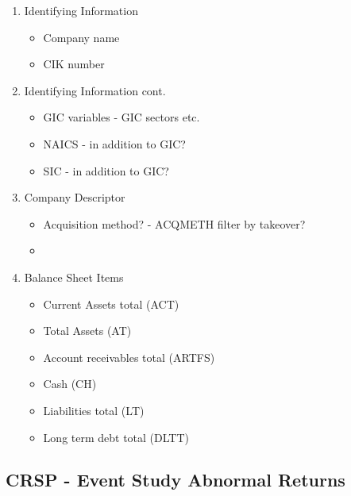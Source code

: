 \documentclass[12pt]{article}
\begin{document}
        \begin{enumerate}
        \item Identifying Information

            \begin{itemize}
                \item Company name 
                \item CIK number 
            \end{itemize}
    
        \item Identifying Information cont.  
        
            \begin{itemize}
                \item GIC variables - GIC sectors etc.
                \item NAICS - in addition to GIC? 
                \item SIC - in addition to GIC?
            \end{itemize}

        \item Company Descriptor

            \begin{itemize}
                \item Acquisition method? - ACQMETH filter by takeover? 
                \item 
            \end{itemize}
        
        \item Balance Sheet Items 

            \begin{itemize}
                \item Current Assets total (ACT)
                \item Total Assets (AT)
                \item Account receivables total (ARTFS)
                \item Cash (CH)
                \item Liabilities total (LT) 
                \item Long term debt total (DLTT)
            \end{itemize}
        
    \end{enumerate}


    \subsection{CRSP - Event Study Abnormal Returns}
\end{document}

